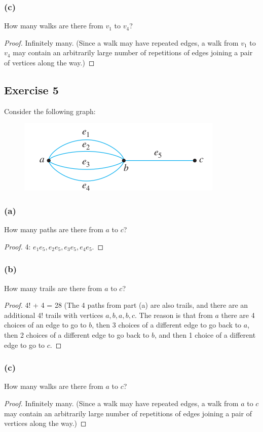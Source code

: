 \documentclass[14pt]{extarticle}
\begin{document}
\subsubsection{(c)}
How many walks are there from \(v_1\) to \(v_4\)?
\begin{proof}
Infinitely many. (Since a walk may have repeated edges, a walk from \(v_1\) to \(v_4\) may contain an arbitrarily large 
number of repetitions of edges joining a pair of vertices along the way.)
\end{proof}

\subsection{Exercise 5}
Consider the following graph:

\begin{figure}[ht!]
\centering
\includegraphics[scale=0.5]{../images/10.1.5.png}
\end{figure}

\subsubsection{(a)}
How many paths are there from \(a\) to \(c\)?
\begin{proof}
4: \(e_1e_5, e_2e_5, e_3e_5, e_4e_5\).
\end{proof}

\subsubsection{(b)}
How many trails are there from \(a\) to \(c\)?
\begin{proof}
4! + 4 = 28 (The 4 paths from part (a) are also trails, and there are an additional 4! trails with vertices \(a,b,a,b,c\). 
The reason is that from \(a\) there are 4 choices of an edge to go to \(b\), then 3 choices of a different edge to go back 
to \(a\), then 2 choices of a different edge to go back to \(b\), and then 1 choice of a different edge to go to \(c\).
\end{proof}

\subsubsection{(c)}
How many walks are there from \(a\) to \(c\)?
\begin{proof}
Infinitely many. (Since a walk may have repeated edges, a walk from \(a\) to \(c\) may contain an arbitrarily large number of 
repetitions of edges joining a pair of vertices along the way.)
\end{proof}
\end{document}
